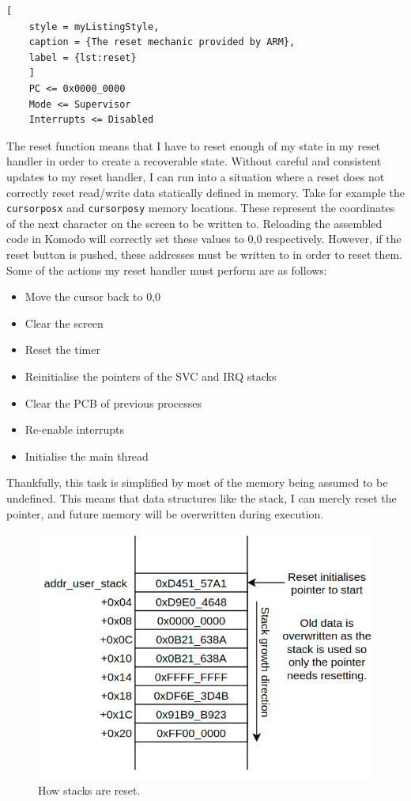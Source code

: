 \begin{lstlisting}[
	style = myListingStyle,
	caption = {The reset mechanic provided by ARM},
	label = {lst:reset}
	]
	PC <= 0x0000_0000
	Mode <= Supervisor
	Interrupts <= Disabled
\end{lstlisting}
The reset function means that I have to reset enough of my state in my reset handler in order to create a recoverable state. Without careful and consistent updates to my reset handler, I can run into a situation where a reset does not correctly reset read/write data statically defined in memory. Take for example the \verb|cursorposx| and \verb|cursorposy| memory locations. These represent the coordinates of the next character on the screen to be written to. Reloading the assembled code in Komodo will correctly set these values to 0,0 respectively. However, if the reset button is pushed, these addresses must be written to in order to reset them. Some of the actions my reset handler must perform are as follows:

\begin{itemize}
	\item Move the cursor back to 0,0
	\item Clear the screen
	\item Reset the timer
	\item Reinitialise the pointers of the SVC and IRQ stacks
	\item Clear the PCB of previous processes
	\item Re-enable interrupts
	\item Initialise the main thread
\end{itemize}

Thankfully, this task is simplified by most of the memory being assumed to be undefined. This means that data structures like the stack, I can merely reset the pointer, and future memory will be overwritten during execution.

\begin{figure}[ht!]
	\includegraphics[width=\linewidth]{figures/reset.png}
	\caption{How stacks are reset.}
	\label{fig:reset}
\end{figure} 


